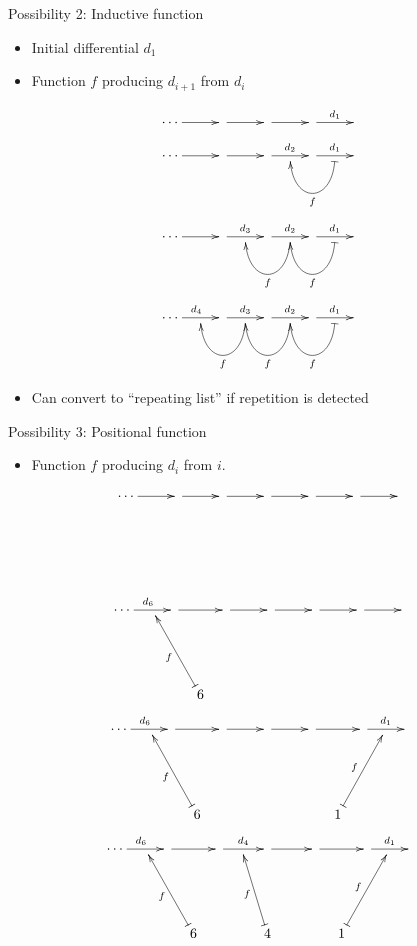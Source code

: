 \begin{frame}{Possibility 2: Inductive function}
\begin{itemize}
\item Initial differential $d_1$
\item Function $f$ producing $d_{i+1}$ from $d_i$
\end{itemize}
\begin{overprint}
\[
\xymatrix@C=1em{
\cdots
\ar[rr] &
&
\ar[rr] &
&
\ar[rr] &
&
\ar[rr]^{d_1} &
&
}
\]
\[
\xymatrix@C=1em{
\cdots
\ar[rr] &
&
\ar[rr] &
&
\ar[rr]^{d_2} &
&
\ar[rr]^{d_1} &
\ar@(d,d)@{|->}[ll]^f &
}
\]
\[
\xymatrix@C=1em{
\cdots
\ar[rr] &
&
\ar[rr]^{d_3} &
&
\ar[rr]^{d_2} &
\ar@(d,d)[ll]^f &
\ar[rr]^{d_1} &
\ar@(d,d)@{|->}[ll]^f &
}
\]
\[
\xymatrix@C=1em{
\cdots
\ar[rr]^{d_4} &
&
\ar[rr]^{d_3} &
\ar@(d,d)[ll]^f &
\ar[rr]^{d_2} &
\ar@(d,d)[ll]^f &
\ar[rr]^{d_1} &
\ar@(d,d)@{|->}[ll]^f &
}
\]
\end{overprint}
\vspace{1em}
\begin{itemize}
\item Can convert to ``repeating list'' if repetition is detected
\end{itemize}
\end{frame}

\begin{frame}{Possibility 3: Positional function}
\begin{itemize}
\item Function $f$ producing $d_i$ from $i$.
\end{itemize}
\vspace{1em}
\begin{overprint}
\[
\xymatrix@C=1em@R=5em{
\cdots
\ar[rr] &&
\ar[rr] &&
\ar[rr] &&
\ar[rr] &&
\ar[rr] &&
\ar[rr] && \\
&&&
&&&
&&&
}
\]
\[
\xymatrix@C=1em@R=5em{
\cdots
\ar[rr]^{d_6} &&
\ar[rr] &&
\ar[rr] &&
\ar[rr] &&
\ar[rr] &&
\ar[rr] && \\
&&& 6 \ar@{|->}[ull]^f
&&&
&&&
}
\]
\[
\xymatrix@C=1em@R=5em{
\cdots
\ar[rr]^{d_6} &&
\ar[rr] &&
\ar[rr] &&
\ar[rr] &&
\ar[rr] &&
\ar[rr]^{d_1} && \\
&&& 6 \ar@{|->}[ull]^f
&&&
&&& 1 \ar@{|->}[urr]^f
}
\]
\[
\xymatrix@C=1em@R=5em{
\cdots
\ar[rr]^{d_6} &&
\ar[rr] &&
\ar[rr]^{d_4} &&
\ar[rr] &&
\ar[rr] &&
\ar[rr]^{d_1} && \\
&&& 6 \ar@{|->}[ull]^f
&&& 4 \ar@{|->}[ul]^f
&&& 1 \ar@{|->}[urr]^f
}
\]
\end{overprint}
\end{frame}

